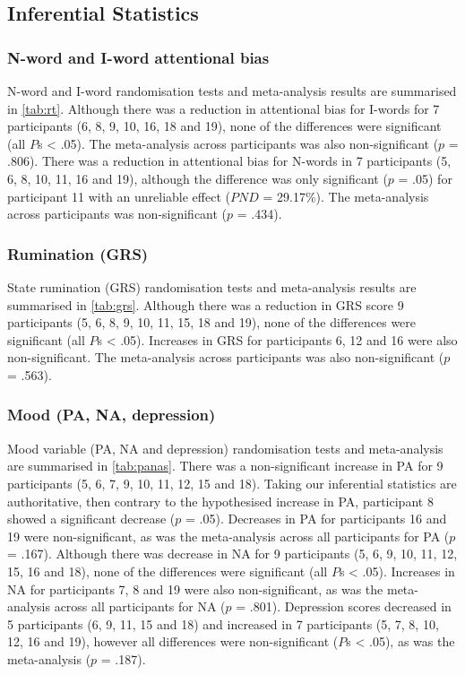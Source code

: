 \documentclass[man,floatsintext,a4paper,biblatex]{apa6}\usepackage[]{graphicx}\usepackage[]{color}
\begin{document}
\clearpage
\subsection{Inferential Statistics}

\subsubsection{N-word and I-word attentional bias}

N-word and I-word randomisation tests and meta-analysis results are
summarised in \cref{tab:rt}. Although there was a reduction in attentional
bias for I-words for 7 participants (6, 8, 9, 10, 16, 18 and 19), none of
the differences were significant (all ${P}$s < .05). The meta-analysis
across participants was also non-significant (${p}$ = .806). There was
a reduction in attentional bias for N-words in 7 participants (5, 6, 8,
10, 11, 16 and 19), although the difference was only significant (${p}$ =
.05) for participant 11 with an unreliable effect (${PND}$ = 29.17\%). The
meta-analysis across participants was non-significant (${p}$ = .434).

\subsubsection{Rumination (GRS)}

State rumination (GRS) randomisation tests and meta-analysis results
are summarised in \cref{tab:grs}. Although there was a reduction in
GRS score 9 participants (5, 6, 8, 9, 10, 11, 15, 18 and 19), none of
the differences were significant (all ${P}$s < .05). Increases in GRS
for participants 6, 12 and 16 were also non-significant. The
meta-analysis across participants was also non-significant (${p}$ = .563).

\subsubsection{Mood (PA, NA, depression)}

Mood variable (PA, NA and depression) randomisation tests and
meta-analysis are summarised in \cref{tab:panas}. There was a
non-significant increase in PA for 9 participants (5, 6, 7, 9, 10, 11,
12, 15 and 18). Taking our inferential statistics are authoritative,
then contrary to the hypothesised increase in PA, participant 8 showed
a significant decrease (${p}$ = .05). Decreases in PA for participants
16 and 19 were non-significant, as was the meta-analysis across all
participants for PA (${p}$ = .167).  Although there was decrease in
NA for 9 participants (5, 6, 9, 10, 11, 12, 15, 16 and 18), none of
the differences were significant (all ${P}$s < .05). Increases in NA
for participants 7, 8 and 19 were also non-significant, as was the
meta-analysis across all participants for NA (${p}$ = .801). Depression
scores decreased in 5 participants (6, 9, 11, 15 and 18) and increased in
7 participants (5, 7, 8, 10, 12, 16 and 19), however all differences were
non-significant (${P}$s < .05), as was the meta-analysis (${p}$ = .187).
\end{document}
